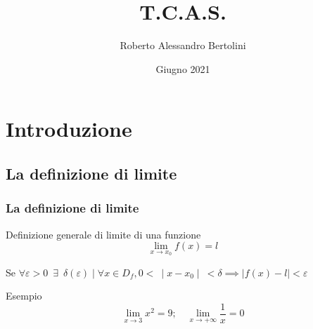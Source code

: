 \documentclass[aspectratio=149]{beamer}
\title{T.C.A.S.}
\author[Roberto Bertolini]{Roberto Alessandro Bertolini}
\institute[Liceo Nervi Ferrari]{Liceo "P. Nervi - G. Ferrari" - Morbegno}
\date{Giugno 2021}
\begin{document}
	
	\begin{frame}
		\titlepage
	\end{frame}
	
	
	\section{Introduzione}
	
	\subsection{La definizione di limite}
	\begin{frame}
		\frametitle{La definizione di limite}
		\begin{block}{Definizione generale di limite di una funzione}
			\[ 
			\lim_{x \to x_{0}}{f(x) = l} 
			\]
			
			Se \( 
			\forall \varepsilon > 0 \enspace \exists \enspace \delta(\varepsilon) \mid \forall x \in D_{f}, 0 < \: \mid x - x_{0} \mid \: <\delta \implies \mid f(x) - l \mid < \varepsilon
			\)
		\end{block}
		\begin{exampleblock}{Esempio}
			\[
				\lim_{x \to 3}{x^2} = 9; \quad \lim_{x \to +\infty}{\frac{1}{x}} = 0
			\]
		\end{exampleblock}
	\end{frame}
	
\end{document}
